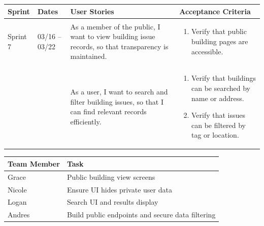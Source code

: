 \documentclass[12pt]{article}
\begin{document}
\noindent
\begin{tabular}{|L{1.2cm}|L{1.8cm}|L{5.2cm}|L{6.3cm}|}
\hline
\textbf{Sprint} & \textbf{Dates} & \textbf{User Stories} & \textbf{Acceptance Criteria} \\
\hline
Sprint 7 & 03/16 -- 03/22 &
As a member of the public, I want to view building issue records, so that transparency is maintained. &
\begin{enumerate}
    \item Verify that public building pages are accessible.
\end{enumerate} \\
& &
As a user, I want to search and filter building issues, so that I can find relevant records efficiently. &
\begin{enumerate}
    \item Verify that buildings can be searched by name or address.
    \item Verify that issues can be filtered by tag or location.
\end{enumerate} \\
\hline
\end{tabular}

\vspace{0.5em}

\noindent
\begin{tabular}{|L{2.5cm}|L{12.5cm}|}
\hline
\textbf{Team Member} & \textbf{Task} \\
\hline
Grace & Public building view screens \\
\hline
Nicole & Ensure UI hides private user data \\
\hline
Logan & Search UI and results display \\
\hline
Andres & Build public endpoints and secure data filtering \\
\hline
\end{tabular}

\vspace{2em}

\vspace{0.5em}
\end{document}
